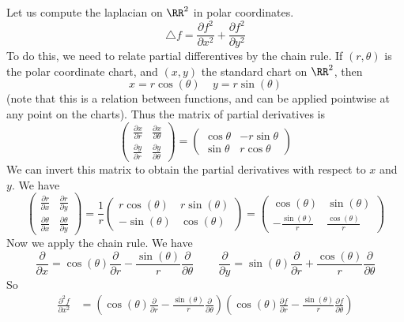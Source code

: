 \begin{example}
    Let us compute the laplacian on $\RR^2$ in polar coordinates.
    \[ \bigtriangleup f = \frac{\partial f^2}{\partial x^2} + \frac{\partial f^2}{\partial y^2} \]
    To do this, we need to relate partial differentives by the chain rule. If $(r,\theta)$ is the polar coordinate chart, and $(x,y)$ the standard chart on $\RR^2$, then
    \[ x = r \cos(\theta)\ \ \ \ \ y = r \sin(\theta) \]
    (note that this is a relation between functions, and can be applied pointwise at any point on the charts). Thus the matrix of partial derivatives is
    \[ \begin{pmatrix} \frac{\partial x}{\partial r} & \frac{\partial x}{\partial \theta} \\ \frac{\partial y}{\partial r} & \frac{\partial y}{\partial \theta} \end{pmatrix} = \begin{pmatrix} \cos \theta & -r \sin \theta \\ \sin \theta & r \cos \theta \end{pmatrix} \]
    We can invert this matrix to obtain the partial derivatives with respect to $x$ and $y$. We have
    \[ \begin{pmatrix} \frac{\partial r}{\partial x} & \frac{\partial r}{\partial y} \\ \frac{\partial \theta}{\partial x} & \frac{\partial \theta}{\partial y} \end{pmatrix} = \frac{1}{r} \begin{pmatrix} r \cos(\theta) & r \sin(\theta) \\ -\sin(\theta) & \cos(\theta) \end{pmatrix} = \begin{pmatrix} \cos(\theta) & \sin(\theta) \\ -\frac{\sin(\theta)}{r} & \frac{\cos(\theta)}{r} \end{pmatrix} \]
    Now we apply the chain rule. We have
    \[ \frac{\partial}{\partial x} = \cos(\theta) \frac{\partial}{\partial r} - \frac{\sin(\theta)}{r} \frac{\partial}{\partial \theta}\ \ \ \ \ \ \ \ \ \ \frac{\partial}{\partial y} = \sin(\theta) \frac{\partial}{\partial r} + \frac{\cos(\theta)}{r} \frac{\partial}{\partial \theta} \]
    So
    \begin{align*}
        \frac{\partial^2 f}{\partial x^2} &= \left( \cos(\theta) \frac{\partial}{\partial r} - \frac{\sin(\theta)}{r} \frac{\partial}{\partial \theta} \right) \left( \cos(\theta) \frac{\partial f}{\partial r} - \frac{\sin(\theta)}{r} \frac{\partial f}{\partial \theta} \right)\\

\end{align*}
\end{example}
